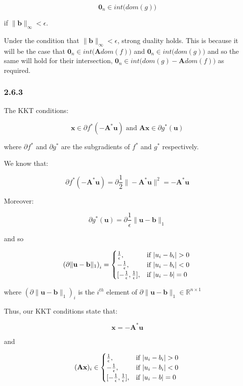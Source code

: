 \documentclass[12pt]{article}
\begin{document}
\[\textbf{0}_n \in int \big(dom(g)\big)\]

if $\|\textbf{b}\|_{\infty} < \epsilon$.

Under the condition that $\|\textbf{b}\|_{\infty} < \epsilon$, strong duality holds. This is because it will be the case that $\textbf{0}_n \in int \big(\textbf{A} dom(f)\big)$ and $\textbf{0}_n \in int \big(dom(g)\big)$ and so the same will hold for their intersection, $\textbf{0}_n \in int \big(dom(g) - \textbf{A}dom(f)\big)$ as required.

\subsubsection*{2.6.3}

The KKT conditions:

\[\textbf{x} \in \partial f^*(-\textbf{A}^*\textbf{u}) \text{ and } \textbf{Ax} \in \partial g^*(\textbf{u})\]

where $\partial f^*$ and $\partial g^*$ are the subgradients of $f^*$ and $g^*$ respectively.

We know that:

\[\partial f^*(-\textbf{A}^*\textbf{u}) = \partial \frac{1}{2}\|-\textbf{A}^*\textbf{u}\|^2 = -\textbf{A}^*\textbf{u}\]

Moreover:

\[\partial g^*(\textbf{u}) = \partial\frac{1}{\epsilon} \| \textbf{u} - \textbf{b}\|_1 \]

and so

\[\left(\partial\| \textbf{u} - \textbf{b}\|_1\right)_i = \begin{cases}
      \frac{1}{\epsilon}, &  \text{if } | u_i - b_i| > 0 \\
      -\frac{1}{\epsilon}, &  \text{if } | u_i - b_i| < 0 \\
      [-\frac{1}{\epsilon}, \frac{1}{\epsilon}], &  \text{if } | u_i - b| = 0 \\
   \end{cases} \\
\]

where $\left(\partial\| \textbf{u} - \textbf{b}\|_1\right)_i$ is the $i^{th}$ element of $\partial\| \textbf{u} - \textbf{b}\|_1 \in \mathbb{R}^{n \times 1}$

Thus, our KKT conditions state that:

\[\textbf{x} = -\textbf{A}^*\textbf{u}\]

and

\[(\textbf{Ax})_i \in \begin{cases}
      \frac{1}{\epsilon}, &  \text{if } | u_i - b_i| > 0 \\
      -\frac{1}{\epsilon}, &  \text{if } | u_i - b_i| < 0 \\
      [-\frac{1}{\epsilon}, \frac{1}{\epsilon}], &  \text{if } | u_i - b| = 0 \\
   \end{cases} \\\]
\end{document}
